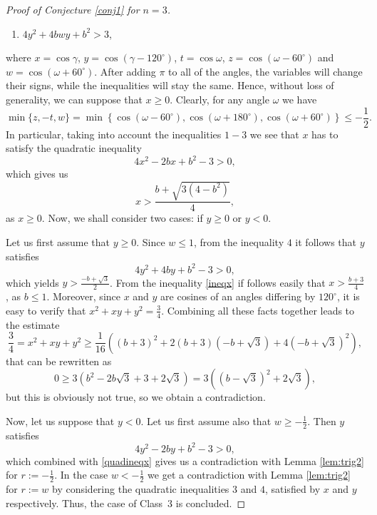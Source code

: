 \documentclass[12pt, a4paper]{article}
\theoremstyle{plain} %
\theoremstyle{definition} %
\theoremstyle{remark} %
\begin{document}
\begin{proof}[Proof of Conjecture \ref{conj1} for $n=3$]
\begin{enumerate}
\item $4y^2 + 4bwy + b^2 > 3$,
\end{enumerate}
where $x = \cos \gamma$, $y = \cos(\gamma - 120^{\circ})$, $t=\cos \omega$, $z=\cos (\omega-60^{\circ})$ and $w = \cos (\omega + 60^{\circ})$. After adding $\pi$ to all of the angles, the variables will change their signs, while the inequalities will stay the same. Hence, without loss of generality, we can suppose that $x \geq 0$. Clearly, for any angle $\omega$ we have
$$\min\{z, -t, w\} = \min \left \{\cos (\omega-60^{\circ}), \cos \left (\omega + 180^{\circ} \right ), \cos (\omega+60^{\circ}) \right \} \leq -\frac{1}{2}.$$
In particular, taking into account the inequalities $1-3$ we see that $x$ has to satisfy the quadratic inequality
\begin{equation}
\label{quadineqx}
4x^2 - 2bx + b^2 - 3 > 0,
\end{equation}
which gives us
\begin{equation}
\label{ineqx}
x > \frac{b+\sqrt{3(4-b^2)}}{4},
\end{equation}
as $x \geq 0$. Now, we shall consider two cases: if $y \geq 0$ or $y<0$.

Let us first assume that $y \geq 0$. Since $w \leq 1$, from the inequality $4$ it follows that $y$ satisfies
$$4y^2 + 4by + b^2 - 3 > 0,$$
which yields $y > \frac{-b+\sqrt{3}}{2}$. From the inequality \eqref{ineqx} if follows easily that $x > \frac{b+3}{4}$, as $b \leq 1$. Moreover, since $x$ and $y$ are cosines of an angles differing by $120^{\circ}$, it is easy to verify that $x^2 + xy + y^2 = \frac{3}{4}$. Combining all these facts together leads to the estimate
$$\frac{3}{4} = x^2 + xy + y^2 \geq \frac{1}{16} \left ((b+3)^2  + 2(b+3)\left ( -b+\sqrt{3} \right )  +  4\left ( -b+\sqrt{3} \right )^2 \right ),$$
that can be rewritten as
$$0 \geq 3 \left (b^2 - 2b\sqrt{3} + 3  + 2\sqrt{3} \right )  = 3 \left ( \left ( b - \sqrt{3} \right )^2 + 2\sqrt{3} \right),$$
but this is obviously not true, so we obtain a contradiction.


Now, let us suppose that $y<0$. Let us first assume also that $w \geq -\frac{1}{2}$. Then $y$ satisfies
$$4y^2 - 2by + b^2 - 3 > 0,$$
which combined with \eqref{quadineqx} gives us a contradiction with Lemma \ref{lem:trig2} for $r:= - \frac{1}{2}$. In the case $w < - \frac{1}{2}$ we get a contradiction with Lemma 
\ref{lem:trig2} for $r:=w$ by considering the quadratic inequalities $3$ and $4$, satisfied by $x$ and $y$ respectively. Thus, the case of Class~$3$ is concluded.



\end{proof}
\end{document}
